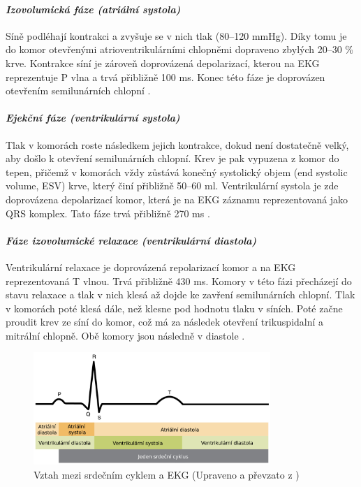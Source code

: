 \paragraph*{\textit{Izovolumická fáze (atriální systola)}\\} Síně podléhají
kontrakci a zvyšuje se v nich tlak (80--120 \si{\mmHg}). Díky tomu je do komor
otevřenými atrioventrikulárními chlopněmi dopraveno zbylých 20--30 \% krve.
Kontrakce síní je zároveň doprovázená depolarizací, kterou na EKG reprezentuje P
vlna a trvá přibližně 100 \si{\ms}. Konec této fáze je doprovázen otevřením
semilunárních chlopní \cite{OpenStax}.

\paragraph*{\textit{Ejekční fáze (ventrikulární systola)}\\} Tlak v komorách
roste následkem jejich kontrakce, dokud není dostatečně velký, aby došlo k
otevření semilunárních chlopní. Krev je pak vypuzena z komor do tepen, přičemž v
komorách vždy zůstává konečný systolický objem (end systolic volume, ESV) krve,
který činí přibližně 50--60 \si{\ml}. Ventrikulární systola je zde doprovázena
depolarizací komor, která je na EKG záznamu reprezentovaná jako QRS komplex.
Tato fáze trvá přibližně 270 \si{\ms} \cite{OpenStax}.

\paragraph*{\textit{Fáze izovolumické relaxace (ventrikulární diastola)}\\}
Ventrikulární relaxace je doprovázená repolarizací komor a na EKG reprezentovaná
T vlnou. Trvá přibližně 430 \si{\ms}. Komory v této fázi přecházejí do stavu relaxace
a tlak v nich klesá až dojde ke zavření semilunárních chlopní. Tlak v komorách
poté klesá dále, než klesne pod hodnotu tlaku v síních. Poté začne proudit krev
ze síní do komor, což má za následek otevření trikuspidalní a mitrální chlopně.
Obě komory jsou následně v diastole \cite{OpenStax}.

\begin{figure}[h]
	\begin{center}
		\includegraphics[width=0.8\textwidth]{../assets/anatomy/cardiac_cycle_ecg}
		\caption{Vztah mezi srdečním cyklem a EKG (Upraveno a převzato z
			\cite{OpenStax})}
		\label{img:cardiac_cycle_ecg}
	\end{center}
\end{figure}


